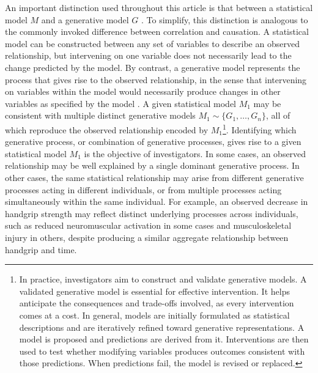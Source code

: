 \documentclass[twocolumn]{article} %
\begin{document}
An important distinction used throughout this article is that between a statistical model $M$ and a generative model $G$ \cite{mcelreath2016statistical}. To simplify, this distinction is analogous to the commonly invoked difference between correlation and causation. A statistical model can be constructed between any set of variables to describe an observed relationship, but intervening on one variable does not necessarily lead to the change predicted by the model. By contrast, a generative model represents the process that gives rise to the observed relationship, in the sense that intervening on variables within the model would necessarily produce changes in other variables as specified by the model \citep[a]{lloyd1967american}. A given statistical model $M_1$ may be consistent with multiple distinct generative models $M_1 \sim \{G_1, \ldots, G_n\}$, all of which reproduce the observed relationship encoded by $M_1$\footnote{In practice, investigators aim to construct and validate generative models. A validated generative model is essential for effective intervention. It helps anticipate the consequences and trade-offs involved, as every intervention comes at a cost. In general, models are initially formulated as statistical descriptions and are iteratively refined toward generative representations. A model is proposed and predictions are derived from it. Interventions are then used to test whether modifying variables produces outcomes consistent with those predictions. When predictions fail, the model is revised or replaced.}. Identifying which generative process, or combination of generative processes, gives rise to a given statistical model $M_1$ is the objective of investigators. In some cases, an observed relationship may be well explained by a single dominant generative process. In other cases, the same statistical relationship may arise from different generative processes acting in different individuals, or from multiple processes acting simultaneously within the same individual. For example, an observed decrease in handgrip strength may reflect distinct underlying processes across individuals, such as reduced neuromuscular activation in some cases and musculoskeletal injury in others, despite producing a similar aggregate relationship between handgrip and time.
\end{document}
